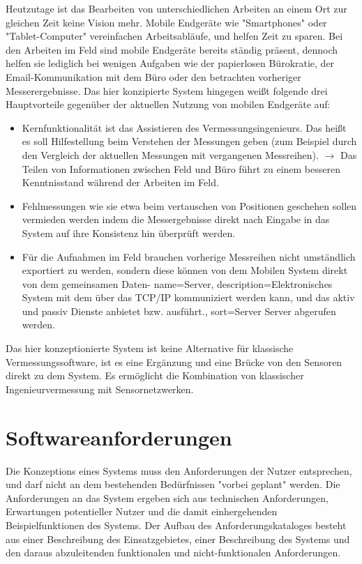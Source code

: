 Heutzutage ist das Bearbeiten von unterschiedlichen Arbeiten an einem Ort zur gleichen Zeit keine Vision mehr. Mobile Endgeräte wie "Smartphones" oder "Tablet-Computer" vereinfachen Arbeitsabläufe, und helfen Zeit zu sparen. Bei den Arbeiten im Feld sind mobile Endgeräte bereits ständig präsent, dennoch helfen sie lediglich bei wenigen Aufgaben wie der papierlosen Bürokratie, der Email-Kommunikation mit dem Büro oder den betrachten vorheriger Messerergebnisse. Das hier konzipierte System hingegen weißt folgende drei Hauptvorteile gegenüber der aktuellen Nutzung von mobilen Endgeräte auf:
\begin{itemize}
\item Kernfunktionalität ist das Assistieren des Vermessungsingenieurs. Das heißt es soll Hilfestellung beim Verstehen der Messungen geben (zum Beispiel durch den Vergleich der aktuellen Messungen mit vergangenen Messreihen). $\rightarrow$ Das Teilen von Informationen zwischen Feld und Büro führt zu einem besseren Kenntnisstand während der Arbeiten im Feld.
\item Fehlmessungen wie sie etwa beim vertauschen von Positionen geschehen sollen vermieden werden indem die Messergebnisse direkt nach Eingabe in das System auf ihre Konsistenz hin überprüft werden.
\item Für die Aufnahmen im Feld brauchen vorherige Messreihen nicht umständlich exportiert zu werden, sondern diese können von dem Mobilen System direkt von dem gemeinsamen Daten-
{
  name={Server},
  description={Elektronisches System mit dem über das TCP/IP kommuniziert werden kann, und das aktiv und passiv Dienste anbietet bzw. ausführt.},
  sort=Server
} \gls{Server} abgerufen werden.
\end{itemize}
Das hier konzeptionierte System ist keine Alternative für klassische Vermessungssoftware, ist es eine Ergänzung und eine Brücke von den Sensoren direkt zu dem System. Es ermöglicht die Kombination von klassischer Ingenieurvermessung mit Sensornetzwerken.

\chapter{Softwareanforderungen}
Die Konzeptions eines Systems muss den Anforderungen der Nutzer entsprechen, und darf nicht an dem bestehenden Bedürfnissen "vorbei geplant" werden. Die Anforderungen an das System ergeben sich aus technischen Anforderungen, Erwartungen potentieller Nutzer und die damit einhergehenden Beispielfunktionen des Systems. Der Aufbau des Anforderungskataloges besteht aus einer Beschreibung des Einsatzgebietes, einer Beschreibung des Systems und den daraus abzuleitenden funktionalen und nicht-funktionalen Anforderungen.

